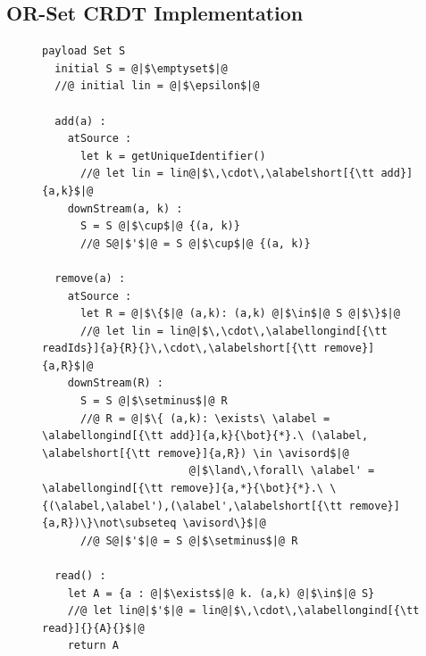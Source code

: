 

\subsection{OR-Set CRDT Implementation}
\label{sec:or-set-crdt}

\begin{figure}[!t]
  \centering
\begin{lstlisting}[caption={Pseudo-code of the OR-Set CRDT},
captionpos=b,label={lst:or-set}]
  payload Set S
  initial S = @|$\emptyset$|@
  //@ initial lin = @|$\epsilon$|@

  add(a) :
    atSource :
      let k = getUniqueIdentifier()
      //@ let lin = lin@|$\,\cdot\,\alabelshort[{\tt add}]{a,k}$|@
    downStream(a, k) :
      S = S @|$\cup$|@ {(a, k)}
      //@ S@|$'$|@ = S @|$\cup$|@ {(a, k)}

  remove(a) :
    atSource :
      let R = @|$\{$|@ (a,k): (a,k) @|$\in$|@ S @|$\}$|@
      //@ let lin = lin@|$\,\cdot\,\alabellongind[{\tt readIds}]{a}{R}{}\,\cdot\,\alabelshort[{\tt remove}]{a,R}$|@
    downStream(R) :
      S = S @|$\setminus$|@ R
      //@ R = @|$\{ (a,k): \exists\ \alabel = \alabellongind[{\tt add}]{a,k}{\bot}{*}.\ (\alabel, \alabelshort[{\tt remove}]{a,R}) \in \avisord$|@
                       @|$\land\,\forall\ \alabel' = \alabellongind[{\tt remove}]{a,*}{\bot}{*}.\ \{(\alabel,\alabel'),(\alabel',\alabelshort[{\tt remove}]{a,R})\}\not\subseteq \avisord\}$|@
      //@ S@|$'$|@ = S @|$\setminus$|@ R

  read() :
    let A = {a : @|$\exists$|@ k. (a,k) @|$\in$|@ S}
    //@ let lin@|$'$|@ = lin@|$\,\cdot\,\alabellongind[{\tt read}]{}{A}{}$|@
    return A
\end{lstlisting}
\end{figure}

